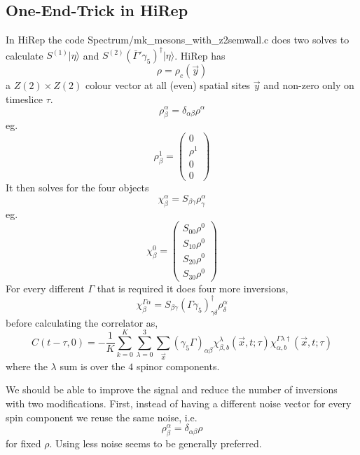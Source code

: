\documentclass[3p,preprint]{elsarticle}
\begin{document}
\subsection{One-End-Trick in HiRep}
In HiRep the code Spectrum/mk\_mesons\_with\_z2semwall.c does two solves to calculate $S^{(1)} | \eta \rangle $ and $S^{(2)} (\bar{ \Gamma }' \gamma_5)^{\dagger} | \eta \rangle $.
HiRep has 
\begin{equation}
\rho = \rho_{ c }(\vec{y})
\end{equation}
a $Z(2) \times Z(2)$ colour vector at all (even) spatial sites $\vec{y}$ and non-zero only on timeslice $\tau$.
\begin{equation}
\rho^{\alpha}_\beta = \delta_{\alpha \beta} \rho^\alpha
\end{equation}
eg.
$$
\rho^1_\beta = \left( \begin{matrix}
  0 \\
  \rho^1 \\
  0 \\
  0
 \end{matrix} \right)
$$
It then solves for the four objects
\begin{equation}
\chi^\alpha_\beta = S_{\beta \gamma} \rho^{\alpha}_\gamma
\end{equation}
eg.
$$
\chi^0_\beta = \left( \begin{matrix}
  S_{00} \rho^0 \\
  S_{10} \rho^0 \\
  S_{20} \rho^0 \\
  S_{30} \rho^0
 \end{matrix} \right)
$$
For every different $\Gamma$ that is required it does four more inversions,
\begin{equation}
\chi^{\Gamma \alpha}_\beta = S_{\beta \gamma} (\Gamma \gamma_5)^\dagger_{\gamma \delta} \rho^{\alpha}_\delta
\end{equation}
before calculating the correlator as,
\begin{equation}
C(t - \tau, 0) = -\frac{1}{K} \sum_{k = 0}^{K} \sum_{\lambda = 0}^{3}\sum_{\vec{x} } (\gamma_5 \Gamma)_{\alpha \beta} \chi^{\lambda}_{\beta, b}(\vec{x}, t; \tau) \chi^{\Gamma \lambda \dagger}_{\alpha, b}(\vec{x}, t; \tau) 
\end{equation}
where the $\lambda$ sum is over the $4$ spinor components.

We should be able to improve the signal and reduce the number of inversions with two modifications. 
First, instead of having a different noise vector for every spin component we reuse the same noise, i.e.
\begin{equation}
\rho^{\alpha}_\beta = \delta_{\alpha \beta} \rho
\end{equation}
for fixed $\rho$. Using less noise seems to be generally preferred.
\end{document}
